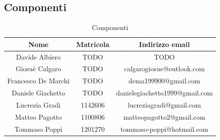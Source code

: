 \subsection{Componenti}

\renewcommand{\arraystretch}{1}
	\begin{table}[H]
		\begin{center}
			\setlength{\aboverulesep}{0pt}
			\setlength{\belowrulesep}{0pt}
			\setlength{\extrarowheight}{.75ex}
			\begin{tabular}{ c c c }
				\rowcolor{AzzurroGruppo!30} 
				\textbf{Nome} & \textbf{Matricola} & \textbf{Indirizzo email}\\
				\toprule
                Davide Albiero & TODO & TODO \\
                Giosuè Calgaro & TODO & calgarogiosue@outlook.com \\
                Francesco De Marchi & TODO & dema199900@gmail.com \\
                Daniele Giachetto & TODO & danielegiachetto1999@gmail.com \\
                Lucrezia Gradi & 1142606 & lucreziagradi@gmail.com \\
				Matteo Pagotto & 1100806 & matteopagotto2@gmail.com \\
                Tommaso Poppi & 1201270 & tommaso-poppi@hotmail.com \\
				\bottomrule
			\end{tabular}
			\caption{Componenti}
		\end{center}
    \end{table}